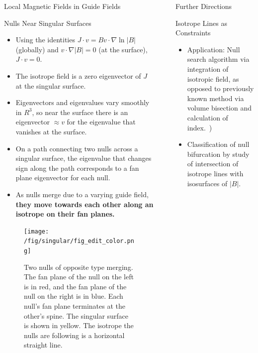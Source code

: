 \documentclass[final]{beamer}
\newlength{\sepwid}
\newlength{\onecolwid}
\begin{document}
\begin{frame}[t]
\begin{columns}[t]
\begin{column}{\onecolwid}
\begin{block}{\huge{Local Magnetic Fields in Guide Fields}}
\begin{block}{Nulls Near Singular Surfaces}
  \begin{itemize}
    \item Using the identities $J\cdot v=B v\cdot \nabla \ln|B|$ (globally) and $v\cdot \nabla |B|=0$ (at the surface), $J\cdot v=0$.
    \item The isotrope field is a zero eigenvector of $J$ at the singular surface.
    \item Eigenvectors and eigenvalues vary smoothly in $R^3$,
      so near the surface there is an eigenvector $\approx v$ for the eigenvalue that vanishes at the surface.
    \item On a path connecting two nulls across a singular surface,
      the eigenvalue that changes sign along the path corresponds to
      a fan plane eigenvector for each null.
    \item As nulls merge due to a varying guide field,
      \textbf{they move towards each other along an isotrope on their fan planes.}
   \end{itemize}
   \begin{figure}
     \texttt{[image: /fig/singular/fig\_edit\_color.png]}
     \hfill
     \begin{minipage}[b]{.45\textwidth}
       \caption{Two nulls of opposite type merging. The fan plane of the null on the left is in red,
       and the fan plane of the null on the right is in blue. Each null's fan plane terminates
       at the other's spine. The singular surface is shown in yellow.
       The isotrope the nulls are following is a horizontal straight line.}
     \end{minipage}
   \end{figure}
   
 \end{block}

\end{block}

\end{column}
\begin{column}{\sepwid}\end{column} %
\begin{column}{\onecolwid}

\begin{block}{\huge Further Directions}
  \begin{block}{Isotrope Lines as Constraints}
    \begin{itemize}
      \item Application: Null search algorithm via integration of isotropic field,
      as opposed to previously known method via volume
      bisection and calculation of index.~\cite{greene1992locating})
      \item Classification of null bifurcation by study of intersection of isotrope lines
        with isosurfaces of $|B|$.
    \end{itemize}
  \end{block}


\end{block}
\end{column}
\end{columns}
\end{frame}
\end{document}
